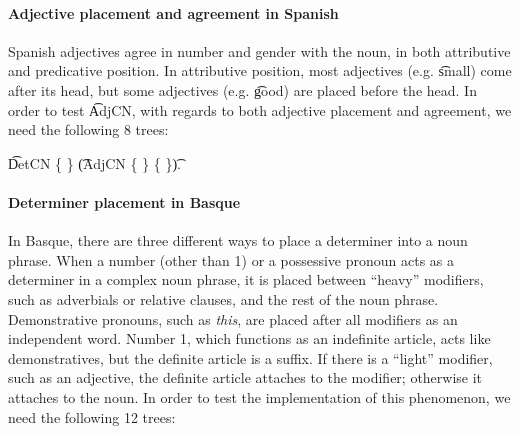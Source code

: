 

\paragraph{Adjective placement and agreement in Spanish}
Spanish adjectives agree in number and gender with the noun, in both
attributive and predicative position. In attributive position, most
adjectives (e.g. \t{small}) come after its head, but some adjectives
(e.g. \t{good}) are placed before the head.
In order to test \t{AdjCN}, with regards to both adjective placement
and agreement, we need the following 8 trees:
\begin{EmptyItem}
\t{DetCN} \; \{  \} \;
 \t{(AdjCN} \; \{  \}
           \{  \}\t{)}.
\end{EmptyItem}

\paragraph{Determiner placement in Basque} In Basque, there are three
different ways to place a determiner into a noun phrase. When a number
(other than 1) or a possessive pronoun acts as a determiner in a
complex noun phrase, it is placed between ``heavy'' modifiers, such as
adverbials or relative clauses, and the rest of the noun phrase.
Demonstrative pronouns, such as \emph{this}, are placed after
all modifiers as an independent word. Number 1, which functions as an
indefinite article, acts like demonstratives, but the definite article
is a suffix. If there is a ``light'' modifier, such as an adjective,
the definite article attaches to the modifier; otherwise it attaches
to the noun.
In order to test the implementation of this phenomenon,
we need the following 12 trees:

